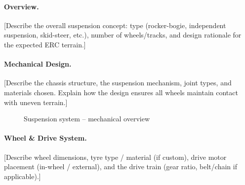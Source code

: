 %

\paragraph{Overview.}
[Describe the overall suspension concept: type (rocker-bogie, independent
suspension, skid-steer, etc.), number of wheels/tracks, and design rationale
for the expected ERC terrain.]

\paragraph{Mechanical Design.}
[Describe the chassis structure, the suspension mechanism, joint types, and
materials chosen. Explain how the design ensures all wheels maintain contact
with uneven terrain.]

\begin{figure}[H]
    \centering
    \caption{Suspension system -- mechanical overview}
    \label{fig:suspension_mech}
\end{figure}

\paragraph{Wheel \& Drive System.}
[Describe wheel dimensions, tyre type / material (if custom), drive motor
placement (in-wheel / external), and the drive train (gear ratio, belt/chain
if applicable).]

